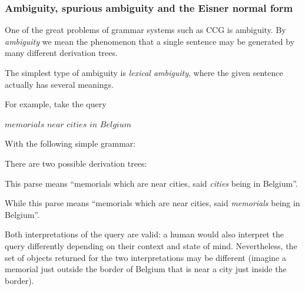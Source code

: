 \documentclass[main.tex]{subfiles}
\begin{document}
\subsubsection{Ambiguity, spurious ambiguity and the Eisner normal form}
One of the great problems of grammar systems such as CCG is ambiguity.
By \emph{ambiguity} we mean the phenomenon that a single sentence may be
generated by many different derivation trees.

The simplest type of ambiguity is \emph{lexical ambiguity}, where the given
sentence actually has several meanings.

\begin{mexample}
    For example, take the query
    \begin{center}
        $memorials$ $near$ $cities$ $in$ $Belgium$
    \end{center}
    With the following simple grammar:


    There are two possible derivation trees:


    This parse means ``memorials which are near cities, said \emph{cities} being
    in Belgium''.


    While this parse means ``memorials which are near cities, said \emph{memorials}
    being in Belgium''.

    Both interpretations of the query are valid: a human would also interpret
    the query differently depending on their context and state of mind.
    Nevertheless, the set of objects returned for the two interpretations may
    be different (imagine a memorial just outside the border of Belgium
    that is near a city just inside the border).
\end{mexample}
\end{document}
